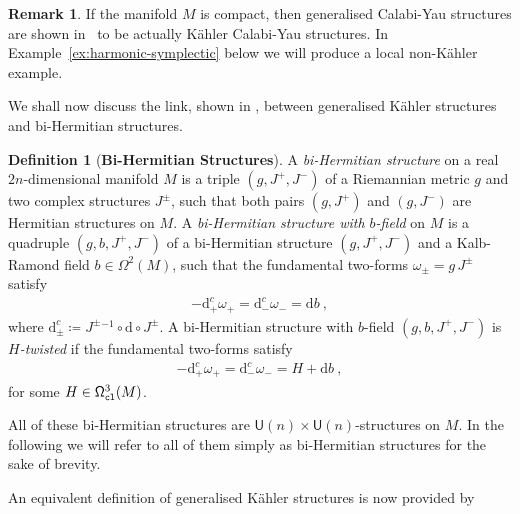 \documentclass[a4paper, reqno, 11pt]{amsart}
\numberwithin{equation}{section}
\theoremstyle{definition}
\newtheorem{definition}[equation]{Definition}
\newtheorem{remark}[equation]{Remark}
\newcommand{\de}{\mathrm{d}}
\newcommand{\sfU}{{\mathsf{U}}}
\newcommand{\sfOmega}{{\mathsf{\Omega}}}
\theoremstyle{remark}
\begin{document}
\begin{remark}
If the manifold $M$ is compact, then generalised Calabi-Yau structures are shown in~\cite[Theorem~4.13]{Apostolov:2022} to be actually K\"ahler Calabi-Yau structures. In Example~\ref{ex:harmonic-symplectic} below we will produce a local non-K\"ahler example.
\end{remark}

We shall now discuss the link, shown in \cite{gualtieri:tesi}, between generalised K{\"a}hler structures and bi-Hermitian structures.

\begin{definition}[\textbf{Bi-Hermitian Structures}]
    A \emph{bi-Hermitian structure} on a real $2n$-dimensional manifold $M$ is a triple $(g, J^+, J^-)$ of a Riemannian metric $g$ and two complex structures $J^\pm$, such that both pairs $(g, J^+)$ and $(g, J^-)$ are Hermitian structures on $M$. A \emph{bi-Hermitian structure with $b$-field} on $M$ is a quadruple $(g,b,J^+,J^-)$ of a bi-Hermitian structure $(g,J^+,J^-)$ and a Kalb-Ramond field $b \in \sfOmega^2(M)$, such that the fundamental two-forms $\omega_{\pm} = g\, J^{\pm}$ satisfy
    \begin{align}
        - \de^c_+ \omega_+ = \de^c_- \omega_- = \de b \ ,
    \end{align} 
    where $\de^c_\pm \coloneqq J^\pm{}^{-1} \circ \de \circ J^\pm$. A bi-Hermitian structure with $b$-field $(g,b,J^+,J^-)$ is $H$\emph{-twisted} if the fundamental two-forms satisfy
     \begin{align} \label{eqn:deomegaH}
        - \de^c_+ \omega_+ = \de^c_- \omega_- = H + \de b \ ,
    \end{align} 
    for some $H \in \sfOmega^3_{\tt cl}(M)$. 
    
    All of these bi-Hermitian structures are $\sfU(n) {\times} \sfU(n)$-structures on $M$. In the following we will refer to all of them simply as bi-Hermitian structures for the sake of brevity.
\end{definition}

An equivalent definition of generalised K\"ahler structures is now provided by
\end{document}
